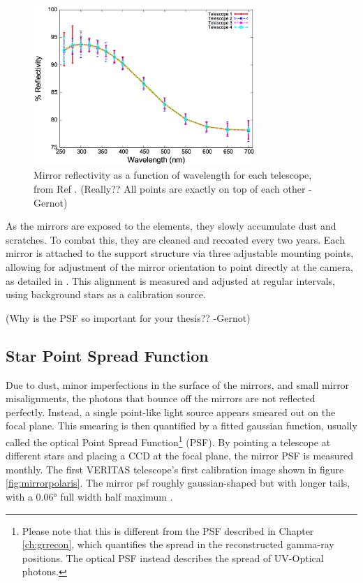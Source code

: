 \begin{figure}[ht]
  \centering
  \includegraphics[width=0.75\textwidth]{images/mirror_reflect}
  \caption[Mirror Reflectivity]{
    Mirror reflectivity as a function of wavelength for each telescope, from Ref \cite{mirrorfacets}. 
    {\color{red}(Really?? All points are exactly on top of each other -Gernot)}
  }
  \label{fig:mirreflect}
\end{figure}

As the mirrors are exposed to the elements, they slowly accumulate dust and scratches.
To combat this, they are cleaned and recoated every two years.
Each mirror is attached to the support structure via three adjustable mounting points, allowing for adjustment of the mirror orientation to point directly at the camera, as detailed in \cite{mirroralign}.
This alignment is measured and adjusted at regular intervals, using background stars as a calibration source.

{\color{red}(Why is the PSF so important for your thesis?? -Gernot)}


\subsection{Star Point Spread Function}

Due to dust, minor imperfections in the surface of the mirrors, and small mirror misalignments, the photons that bounce off the mirrors are not reflected perfectly.
Instead, a single point-like light source appears smeared out on the focal plane.
This smearing is then quantified by a fitted gaussian function, usually called the optical Point Spread Function\footnote{Please note that this is different from the PSF described in Chapter \ref{ch:grrecon}, which quantifies the spread in the reconstructed gamma-ray positions.  The optical PSF instead describes the spread of UV-Optical photons.} (PSF).
By pointing a telescope at different stars and placing a CCD at the focal plane, the mirror PSF is measured monthly.
The first VERITAS telescope's first calibration image shown in figure \ref{fig:mirrorpolaris}.
The mirror psf roughly gaussian-shaped but with longer tails, with a $ \ang{0.06} $ full width half maximum \cite{Veritas_Detector}.


